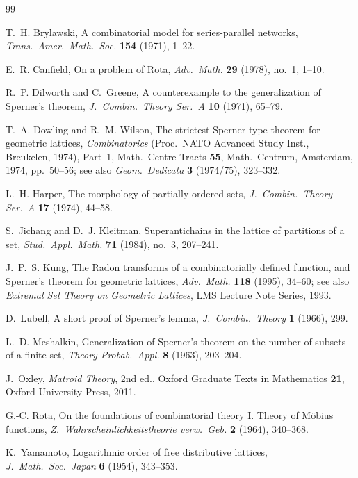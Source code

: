 \documentclass[11pt]{article}
\theoremstyle{definition}
\theoremstyle{remark}
\begin{document}
\begin{thebibliography}{99}

T.~H. Brylawski, A combinatorial model for series-parallel networks, \emph{Trans.\ Amer.\ Math.\ Soc.} \textbf{154} (1971), 1--22.

E.~R. Canfield, On a problem of Rota, \emph{Adv.\ Math.} \textbf{29} (1978), no.~1, 1--10.

R.~P. Dilworth and C.~Greene, A counterexample to the generalization of Sperner's theorem, \emph{J.\ Combin.\ Theory Ser.~A} \textbf{10} (1971), 65--79.

T.~A. Dowling and R.~M. Wilson, The strictest Sperner-type theorem for geometric lattices, \emph{Combinatorics} (Proc.\ NATO Advanced Study Inst., Breukelen, 1974), Part~1, Math.\ Centre Tracts \textbf{55}, Math.\ Centrum, Amsterdam, 1974, pp.~50--56; see also \emph{Geom.\ Dedicata} \textbf{3} (1974/75), 323--332.

L.~H. Harper, The morphology of partially ordered sets, \emph{J.\ Combin.\ Theory Ser.~A} \textbf{17} (1974), 44--58.

S.~Jichang and D.~J. Kleitman, Superantichains in the lattice of partitions of a set, \emph{Stud.\ Appl.\ Math.} \textbf{71} (1984), no.~3, 207--241.

J.~P.~S. Kung, The Radon transforms of a combinatorially defined function, and Sperner's theorem for geometric lattices, \emph{Adv.\ Math.} \textbf{118} (1995), 34--60; see also \emph{Extremal Set Theory on Geometric Lattices}, LMS Lecture Note Series, 1993.

D.~Lubell, A short proof of Sperner's lemma, \emph{J.\ Combin.\ Theory} \textbf{1} (1966), 299.

L.~D. Meshalkin, Generalization of Sperner's theorem on the number of subsets of a finite set, \emph{Theory Probab.\ Appl.} \textbf{8} (1963), 203--204.

J.~Oxley, \emph{Matroid Theory}, 2nd ed., Oxford Graduate Texts in Mathematics \textbf{21}, Oxford University Press, 2011.

G.-C. Rota, On the foundations of combinatorial theory I. Theory of M\"obius functions, \emph{Z.\ Wahrscheinlichkeitstheorie verw.\ Geb.} \textbf{2} (1964), 340--368.

K.~Yamamoto, Logarithmic order of free distributive lattices, \emph{J.\ Math.\ Soc.\ Japan} \textbf{6} (1954), 343--353.

\end{thebibliography}
\end{document}
